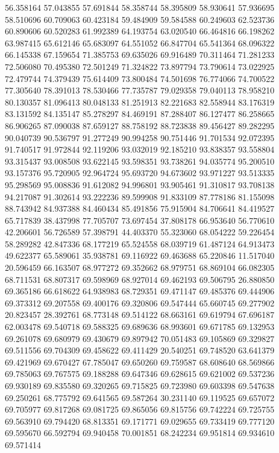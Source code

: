 56.358164
57.043855
57.691844
58.358744
58.395809
58.930641
57.936695
58.510696
60.709063
60.423184
59.484909
59.584588
60.249603
62.523736
60.890606
60.520283
61.992389
64.193754
63.020540
66.464816
66.198262
63.987415
65.612146
65.683097
64.551052
66.847704
65.541364
68.096322
66.145338
67.159654
71.385753
69.635026
69.916489
70.311464
71.281233
72.506080
70.495380
72.501249
71.324822
73.897794
73.790614
73.022925
72.479744
74.379439
75.614409
73.800484
74.501698
76.774066
74.700522
77.305640
78.391013
78.530466
77.735787
79.029358
79.040113
78.958210
80.130357
81.096413
80.048133
81.251913
82.221683
82.558944
83.176319
83.131592
84.135147
85.278297
84.469191
87.288407
86.127477
86.258665
86.906265
87.090038
87.659127
88.758192
88.723838
89.456427
89.282295
90.040739
90.536797
91.277249
90.994258
90.751446
91.701534
92.072395
91.740517
91.972844
92.119206
93.032019
92.185210
93.838357
93.558804
93.315437
93.008508
93.622145
93.598351
93.738261
94.035774
95.200510
93.157376
95.720905
92.964724
95.693720
94.673602
93.971227
93.513335
95.298569
95.008836
91.612082
94.996801
93.905461
91.310817
93.708138
94.217087
91.302614
93.222236
89.599908
91.833109
87.778186
81.155098
88.743942
84.937388
84.460434
85.491856
75.915904
84.706641
84.419527
65.717839
38.437998
77.705707
73.697454
37.808178
66.953640
56.770610
42.206601
56.726589
57.398791
44.403370
55.323060
68.054222
59.226454
58.289282
42.847336
68.177219
65.524558
68.039719
61.487124
64.913473
49.622377
65.589061
35.938781
69.116922
69.463688
65.220846
11.517040
20.596459
66.163507
68.977272
69.352662
68.979751
68.869104
66.082305
68.711531
68.807317
69.598969
68.927014
69.462193
69.506795
26.880850
69.365186
66.618622
64.938983
68.729351
69.471147
69.485376
69.444906
69.373312
69.207558
69.400176
69.320806
69.547444
65.660745
69.277902
20.823457
28.392761
68.773148
69.514122
68.663161
69.619794
67.696187
62.003478
69.540718
69.588325
69.689636
68.993601
69.671785
69.132953
69.261078
69.680979
69.430679
69.897942
70.051483
69.105869
69.329827
69.511556
69.704309
69.458622
69.411429
20.540251
69.748520
63.641379
69.421969
69.670427
67.785047
69.650260
69.759587
68.608640
68.569866
69.785063
69.767575
69.188288
69.647346
69.628615
69.621002
69.537236
69.930189
69.835580
69.320265
69.715825
69.723980
69.603398
69.547638
69.250261
68.775792
69.641565
69.587264
30.231140
69.119525
69.657072
69.705977
69.817268
69.081725
69.865056
69.815756
69.742224
69.725755
69.563910
69.794420
68.813351
69.171771
69.029655
69.733419
69.777120
69.595670
66.592794
69.940458
70.001851
68.242234
69.951814
69.934610
69.571414

